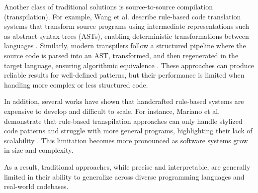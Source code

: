 Another class of traditional solutions is source-to-source compilation
(transpilation). For example, Wang et al. describe rule-based code translation
systems that transform source programs using intermediate representations such
as abstract syntax trees (ASTs), enabling deterministic transformations between
languages \cite{traditional_translation_survey}. Similarly, modern transpilers
follow a structured pipeline where the source code is parsed into an AST,
transformed, and then regenerated in the target language, ensuring algorithmic
equivalence \cite{transpiler_ast}. These approaches can produce reliable results
for well-defined patterns, but their performance is limited when handling more
complex or less structured code.

In addition, several works have shown that handcrafted rule-based systems are
expensive to develop and difficult to scale. For instance, Mariano et al.
demonstrate that rule-based transpilation approaches can only handle stylized
code patterns and struggle with more general programs, highlighting their lack
of scalability \cite{ngst2}. This limitation becomes more pronounced as software
systems grow in size and complexity.

As a result, traditional approaches, while precise and interpretable, are
generally limited in their ability to generalize across diverse programming
languages and real-world codebases.